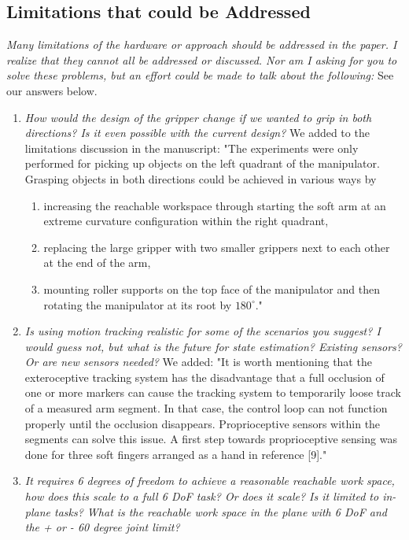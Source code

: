 \documentclass[letterpaper, 10 pt, twocolumn, conference]{article}
\begin{document}
\subsection{Limitations that could be Addressed}
\textit{Many limitations of the hardware or approach should be addressed in the paper. I realize that they cannot all be addressed or discussed. Nor am I asking for you to solve these problems, but an effort could be made to talk about the following:}
See our answers below.
%
\begin{enumerate}
\item \textit{How would the design of the gripper change if we wanted to grip in both directions? Is it even possible with the current design?}
%
We added to the limitations discussion in the manuscript:
"The experiments were only performed for picking up objects on the left quadrant of the manipulator. Grasping objects in both directions could be achieved in various ways by 
\begin{enumerate}
\item increasing the reachable workspace through starting the soft arm at an extreme curvature configuration within the right quadrant,
\item replacing the large gripper with two smaller grippers next to each other at the end of the arm, 
\item mounting roller supports on the top face of the manipulator and then rotating the manipulator at its root by $180^{\circ}$."  
\end{enumerate}
%
\item \textit{Is using motion tracking realistic for some of the scenarios you suggest? I would guess not, but what is the future for state estimation? Existing sensors? Or are new sensors needed?}
%
We added:
"It is worth mentioning that the exteroceptive tracking system has the disadvantage that a full occlusion of one or more markers can cause the tracking system to temporarily loose track of a measured arm segment. In that case, the control loop can not function properly until the occlusion disappears. Proprioceptive sensors within the segments can solve this issue. A first step towards proprioceptive sensing was done for three soft fingers arranged as a hand in reference [9]."
%
\item \textit{It requires 6 degrees of freedom to achieve a reasonable reachable work space, how does this scale to a full 6 DoF task? Or does it scale? Is it limited to in-plane tasks? What is the reachable work space in the plane with 6 DoF and the + or - 60 degree joint limit?}

\end{enumerate}
\end{document}
